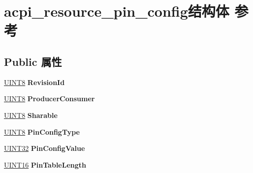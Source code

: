 \hypertarget{structacpi__resource__pin__config}{}\section{acpi\+\_\+resource\+\_\+pin\+\_\+config结构体 参考}
\label{structacpi__resource__pin__config}
\subsection*{Public 属性}
\begin{DoxyCompactItemize}
\item 
\mbox{\label{structacpi__resource__pin__config_a6960734342d4b4278c274d43b0fa3cf2}} 
\hyperlink{_processor_bind_8h_ab27e9918b538ce9d8ca692479b375b6a}{U\+I\+N\+T8} {\bfseries Revision\+Id}
\item 
\mbox{\label{structacpi__resource__pin__config_a2c879c5053730af8bf78d22b51dab077}} 
\hyperlink{_processor_bind_8h_ab27e9918b538ce9d8ca692479b375b6a}{U\+I\+N\+T8} {\bfseries Producer\+Consumer}
\item 
\mbox{\label{structacpi__resource__pin__config_a611a99eb4199e897f3b85e7db14ed8bd}} 
\hyperlink{_processor_bind_8h_ab27e9918b538ce9d8ca692479b375b6a}{U\+I\+N\+T8} {\bfseries Sharable}
\item 
\mbox{\label{structacpi__resource__pin__config_a7dae50881e4225119e57d2a1cc7cdb04}} 
\hyperlink{_processor_bind_8h_ab27e9918b538ce9d8ca692479b375b6a}{U\+I\+N\+T8} {\bfseries Pin\+Config\+Type}
\item 
\mbox{\label{structacpi__resource__pin__config_ad067a523cedb14c4aef2a38b5b2f2918}} 
\hyperlink{_processor_bind_8h_ae1e6edbbc26d6fbc71a90190d0266018}{U\+I\+N\+T32} {\bfseries Pin\+Config\+Value}
\item 
\mbox{\label{structacpi__resource__pin__config_a6da15cc9a611c081f4a90b5368368046}} 
\hyperlink{_processor_bind_8h_a09f1a1fb2293e33483cc8d44aefb1eb1}{U\+I\+N\+T16} {\bfseries Pin\+Table\+Length}
\item 

\end{DoxyCompactItemize}

